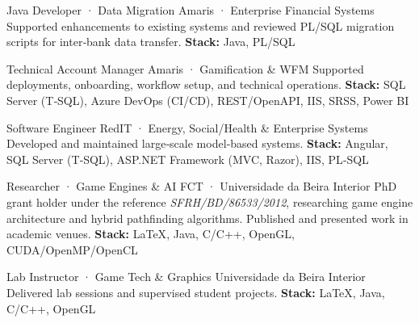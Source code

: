 \documentclass[
	a4paper,
]{fortysecondscv}
\begin{document}
\begin{cvtable}[3]
        {Java Developer · Data Migration}
        {Amaris · Enterprise Financial Systems}
        {Supported enhancements to existing systems and reviewed PL/SQL migration scripts for inter‑bank data transfer.
         \newline \textbf{Stack:} 
         {\color{skyellow}Java}, 
         {\color{skyellow}PL/SQL}}

        {Technical Account Manager}
        {Amaris · Gamification \& WFM}
        {Supported deployments, onboarding, workflow setup, and technical operations.
         \newline \textbf{Stack:} 
         {\color{sklimegreen}SQL Server (T‑SQL)}, 
         {\color{sklimegreen}Azure DevOps (CI/CD)}, 
         {\color{skyellow}REST/OpenAPI},
         {\color{skyellow}IIS}, 
         {\color{skyellow}SRSS, Power BI}}

        {Software Engineer}
        {RedIT · Energy, Social/Health \& Enterprise Systems}
        {Developed and maintained large‑scale model‑based systems.
         \newline \textbf{Stack:} 
         {\color{skgreen}Angular}, 
         {\color{sklimegreen}SQL Server (T‑SQL)}, 
         {\color{skyellow}ASP.NET Framework (MVC, Razor), IIS}, 
         {\color{skyellow}PL‑SQL}}

        {Researcher · Game Engines \& AI}
        {FCT · Universidade da Beira Interior}
        {PhD grant holder under the reference 
         \textit{SFRH/BD/86533/2012}, researching game engine architecture and hybrid pathfinding algorithms.
         Published and presented work in academic venues.
         \newline \textbf{Stack:}
         {\color{sklimegreen}LaTeX},
         {\color{skyellow}Java},
         {\color{skorange}C/C++}, 
         {\color{skorange}OpenGL},
         {\color{skorange}CUDA/OpenMP/OpenCL}}    

        {Lab Instructor · Game Tech \& Graphics}
        {Universidade da Beira Interior}
        {Delivered lab sessions and supervised student projects.
         \newline \textbf{Stack:} 
         {\color{sklimegreen}LaTeX},
         {\color{skyellow}Java},   
         {\color{skorange}C/C++},
         {\color{skorange}OpenGL}}


\end{cvtable}
\end{document}
